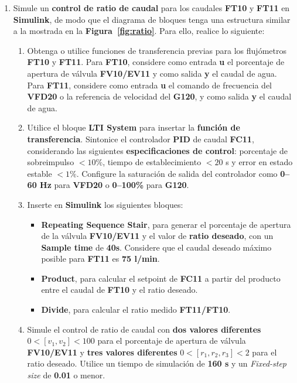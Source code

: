\begin{enumerate}[label=\arabic*)]
    \item Simule un \textbf{control de ratio de caudal} para los caudales \textbf{FT10} y \textbf{FT11} en \textbf{Simulink}, de modo que el diagrama de bloques tenga una estructura similar a la mostrada en la \textbf{Figura~\ref{fig:ratio}}. Para ello, realice lo siguiente:
    \begin{enumerate}[label=\alph*.]
        \item Obtenga o utilice funciones de transferencia previas para los flujómetros \textbf{FT10} y \textbf{FT11}. Para \textbf{FT10}, considere como entrada \textbf{u} el porcentaje de apertura de válvula \textbf{FV10/EV11} y como salida \textbf{y} el caudal de agua. Para \textbf{FT11}, considere como entrada \textbf{u} el comando de frecuencia del \textbf{VFD20} o la referencia de velocidad del \textbf{G120}, y como salida \textbf{y} el caudal de agua.

        \item Utilice el bloque \textbf{LTI System} para insertar la \textbf{función de transferencia}. Sintonice el controlador \textbf{PID} de caudal \textbf{FC11}, considerando las siguientes \textbf{especificaciones de control}: porcentaje de sobreimpulso \(<10\%\), tiempo de establecimiento \(<20\) s y error en estado estable \(<1\%\). Configure la saturación de salida del controlador como \textbf{0--60 Hz} para \textbf{VFD20} o \textbf{0--100\%} para \textbf{G120}.

        \item Inserte en \textbf{Simulink} los siguientes bloques:
        \begin{itemize}
            \item \textbf{Repeating Sequence Stair}, para generar el porcentaje de apertura de la válvula \textbf{FV10/EV11} y el valor de \textbf{ratio deseado}, con un \textbf{Sample time} de \textbf{40s}. Considere que el caudal deseado máximo posible para \textbf{FT11} es \textbf{75 l/min}.
            \item \textbf{Product}, para calcular el setpoint de \textbf{FC11} a partir del producto entre el caudal de \textbf{FT10} y el ratio deseado.
            \item \textbf{Divide}, para calcular el ratio medido \textbf{FT11/FT10}.
        \end{itemize}

        \item Simule el control de ratio de caudal con \textbf{dos valores diferentes} \(0 < [v_1,v_2] < 100\) para el porcentaje de apertura de válvula \textbf{FV10/EV11} y \textbf{tres valores diferentes} \(0 < [r_1,r_2,r_3] < 2\) para el ratio deseado. Utilice un tiempo de simulación de \textbf{160 s} y un \textit{Fixed-step size} de \textbf{0.01} o menor.
    \end{enumerate}


\end{enumerate}
